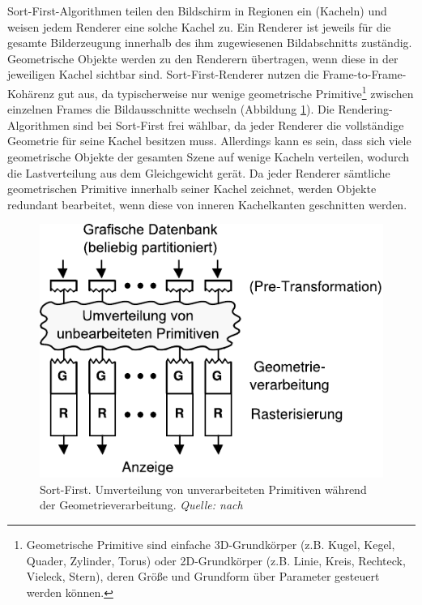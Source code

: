 Sort-First-Algorithmen teilen den Bildschirm in Regionen ein (Kacheln) und weisen jedem Renderer eine solche Kachel zu. Ein Renderer ist jeweils für die gesamte Bilderzeugung innerhalb des ihm zugewiesenen Bildabschnitts zuständig. Geometrische Objekte werden zu den Renderern übertragen, wenn diese in der jeweiligen Kachel sichtbar sind. Sort-First-Renderer nutzen die Frame-to-Frame-Kohärenz gut aus, da typischerweise nur wenige geometrische Primitive\footnote{Geometrische Primitive sind einfache 3D-Grundkörper (z.B. Kugel, Kegel, Quader, Zylinder, Torus) oder 2D-Grundkörper (z.B. Linie, Kreis, Rechteck, Vieleck, Stern), deren Größe und Grundform über Parameter gesteuert werden können.} zwischen einzelnen Frames die Bildausschnitte wechseln (Abbildung \ref{fig:relwork:sortfirst}). Die Rendering-Algorithmen sind bei Sort-First frei wählbar, da jeder Renderer die vollständige Geometrie für seine Kachel besitzen muss. Allerdings kann es sein, dass sich viele geometrische Objekte der gesamten Szene auf wenige Kacheln verteilen, wodurch die Lastverteilung aus dem Gleichgewicht gerät. Da jeder Renderer sämtliche geometrischen Primitive innerhalb seiner Kachel zeichnet, werden Objekte redundant bearbeitet, wenn diese von inneren Kachelkanten geschnitten werden.
\begin{figure}
 \centering
  \includegraphics[scale=0.8]{images/sort-first.pdf}
  \caption[Sort-First]{Sort-First. Umverteilung von unverarbeiteten Primitiven während der Geometrieverarbeitung. \textit{Quelle: nach}}
 \label{fig:relwork:sortfirst}
\end{figure}

